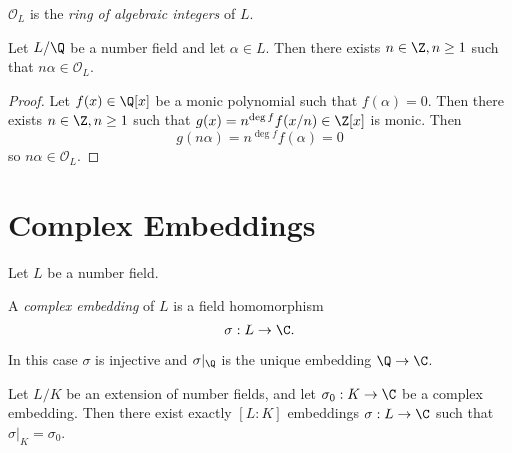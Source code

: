\documentclass[a4paper]{article}
\renewcommand*{\O}{\mathcal{O}}
\begin{document}
\begin{definition}
  \(\O_L\) is the \emph{ring of algebraic integers} of \(L\).
\end{definition}

\begin{lemma}
  Let \(L/\Q\) be a number field and let \(\alpha \in L\). Then there exists \(n \in \Z, n \geq 1\) such that \(n \alpha \in \O_L\).
\end{lemma}

\begin{proof}
  Let \(f(x) \in \Q[x]\) be a monic polynomial such that \(f(\alpha) = 0\). Then there exists \(n \in \Z, n \geq 1\) such that \(g(x) = n^{\deg f} f(x/n) \in \Z[x]\) is monic. Then
  \[
    g(n\alpha) = n^{\deg f} f(\alpha) = 0
  \]
  so \(n\alpha \in \O_L\).
\end{proof}

\section{Complex Embeddings}

Let \(L\) be a number field.

\begin{definition}
  A \emph{complex embedding} of \(L\) is a field homomorphism
  \[
    \sigma: L \to \C.
  \]
\end{definition}

\begin{note}
  In this case \(\sigma\) is injective and \(\sigma|_\Q\) is the unique embedding \(\Q \to \C\).
\end{note}

\begin{proposition}
  Let \(L/K\) be an extension of number fields, and let \(\sigma_0: K \to \C\) be a complex embedding. Then there exist exactly \([L:K]\) embeddings \(\sigma: L \to \C\) such that \(\sigma|_K = \sigma_0\).
\end{proposition}
\end{document}
